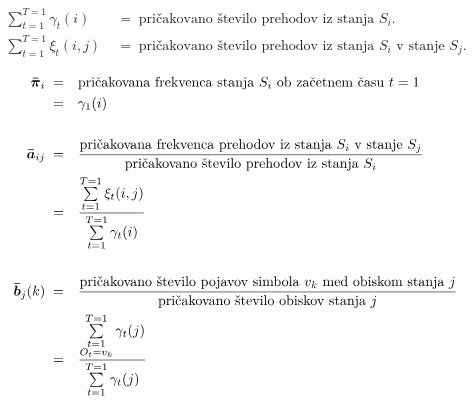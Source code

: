 \begin{align*}
\sum\limits_{t=1}^{T=1} \gamma_t(i)\;&=\;\text{pričakovano število prehodov iz stanja $S_i$.} \\
\sum\limits_{t=1}^{T=1} \xi_t(i, j)\;&=\;\text{pričakovano število prehodov iz stanja $S_i$ v stanje $S_j$.}
\end{align*}

\begin{align}
\boldsymbol{\bar{\pi}}_i\;=&\quad\text{pričakovana frekvenca stanja $S_i$ ob začetnem času $t=1$} \nonumber \\
=&\quad\gamma_1(i)
\\[\baselineskip]
\boldsymbol{\bar{a}}_{ij}\;=&\quad\frac{
\text{pričakovana frekvenca prehodov iz stanja $S_i$ v stanje $S_j$}
}{
\text{pričakovano število prehodov iz stanja $S_i$}
} \nonumber \\
=&\quad\frac{
\sum\limits_{t=1}^{T=1} \xi_t(i, j)
}{
\sum\limits_{t=1}^{T=1} \gamma_t(i)
}
\\[\baselineskip]
\boldsymbol{\bar{b}}_j(k)\;=&\quad\frac{
\text{pričakovano število pojavov simbola $v_k$ med obiskom stanja $j$}
}{
\text{pričakovano število obiskov stanja $j$}
} \nonumber \\
=&\quad\frac{
\sum\limits_{\substack{t=1 \\ O_t = v_k}}^{T=1} \gamma_t(j)
}{
\sum\limits_{t=1}^{T=1} \gamma_t(j)
}
\end{align}
